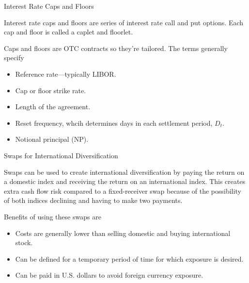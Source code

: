 \documentclass[../custom]{flashcards}
\begin{document}
\begin{flashcard}[\studyArea]{Interest Rate Caps and Floors}
    \begin{flushleft}
        Interest rate caps and floors are series of interest rate call and put options. Each cap and floor is called a caplet and floorlet.\newline

        Caps and floors are OTC contracts so they're tailored. The terms generally specify
        \begin{itemize}
            \item Reference rate---typically LIBOR.
            \item Cap or floor strike rate.
            \item Length of the agreement.
            \item Reset frequency, whcih determines days in each settlement period, $D_t$.
            \item Notional principal ($\text{NP}$).
        \end{itemize}
    \end{flushleft}
\end{flashcard}

\begin{flashcard}[\studyArea]{Swaps for International Diversification}
    \begin{flushleft}
        Swaps can be used to create international diversification by paying the return on a domestic index and receiving the return on an international index. This creates extra cash flow risk compared to a fixed-receiver swap because of the possibility of both indices declining and having to make two payments.\newline

        Benefits of using these swaps are
        \begin{itemize}
            \item Costs are generally lower than selling domestic and buying international stock.
            \item Can be defined for a temporary period of time for which exposure is desired.
            \item Can be paid in U.S. dollars to avoid foreign currency exposure.
        \end{itemize}
    \end{flushleft}
\end{flashcard}

\renewcommand{\studyArea}{Trading, Monitoring and Rebalancing}
\end{document}
